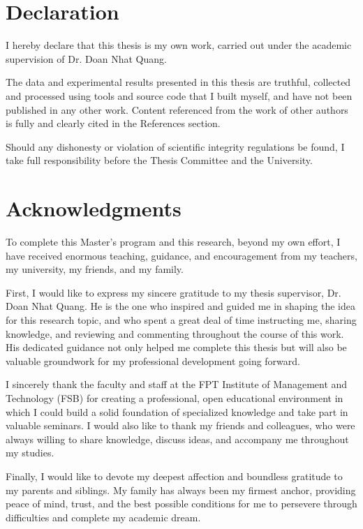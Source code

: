 \documentclass[12pt,a4paper]{report}
\begin{document}
\chapter*{Declaration}
I hereby declare that this thesis is my own work, carried out under the academic supervision of Dr. Doan Nhat Quang.

The data and experimental results presented in this thesis are truthful, collected and processed using tools and source code that I built myself, and have not been published in any other work. Content referenced from the work of other authors is fully and clearly cited in the References section.

Should any dishonesty or violation of scientific integrity regulations be found, I take full responsibility before the Thesis Committee and the University.

\chapter*{Acknowledgments}
To complete this Master's program and this research, beyond my own effort, I have received enormous teaching, guidance, and encouragement from my teachers, my university, my friends, and my family.

First, I would like to express my sincere gratitude to my thesis supervisor, Dr. Doan Nhat Quang. He is the one who inspired and guided me in shaping the idea for this research topic, and who spent a great deal of time instructing me, sharing knowledge, and reviewing and commenting throughout the course of this work. His dedicated guidance not only helped me complete this thesis but will also be valuable groundwork for my professional development going forward.

I sincerely thank the faculty and staff at the FPT Institute of Management and Technology (FSB) for creating a professional, open educational environment in which I could build a solid foundation of specialized knowledge and take part in valuable seminars. I would also like to thank my friends and colleagues, who were always willing to share knowledge, discuss ideas, and accompany me throughout my studies.

Finally, I would like to devote my deepest affection and boundless gratitude to my parents and siblings. My family has always been my firmest anchor, providing peace of mind, trust, and the best possible conditions for me to persevere through difficulties and complete my academic dream.
\end{document}
